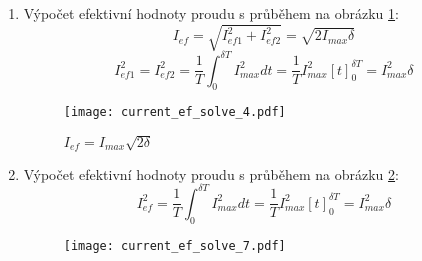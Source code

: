 \begin{enumerate}[noitemsep]
      \item Výpočet efektivní hodnoty proudu s průběhem na obrázku \ref{es:fig_current_ef_solve_4}:
        \begin{equation}\label{es:eq_Ief4_solve}
            I_{ef}=\sqrt{I_{ef1}^2+I_{ef2}^2}=\sqrt{2I_{max}\delta}
        \end{equation}
        {\footnotesize
          \begin{equation}\label{es:eq_Ief4}
              I_{ef1}^2=I_{ef2}^2
                      =\frac{1}{T}\int_0^{\delta T}{I_{max}^2}dt           
                      =\frac{1}{T}I_{max}^2[t]_0^{\delta T}=I_{max}^2\delta
          \end{equation}
        } %
        \begin{figure}[ht!]
          \centering
          \texttt{[image: current\_ef\_solve\_4.pdf]}
          \caption{$I_{ef}=I_{max}\sqrt{2\delta}$}\label{es:fig_current_ef_solve_4}
        \end{figure}

      \item Výpočet efektivní hodnoty proudu s průběhem na obrázku \ref{es:fig_current_ef_solve_7}:
          \begin{equation}\label{es:eq_current_ef_solve_7}
            I_{ef}^2 = \frac{1}{T}\int_0^{\delta T}{I_{max}^2}dt 
                     = \frac{1}{T}I_{max}^2[t]_0^{\delta T}=I_{max}^2\delta
          \end{equation}

          \begin{figure}[ht!]
            \centering
            \texttt{[image: current\_ef\_solve\_7.pdf]}
            \caption{ }
            \label{es:fig_current_ef_solve_7}
          \end{figure}
        

\end{enumerate}
